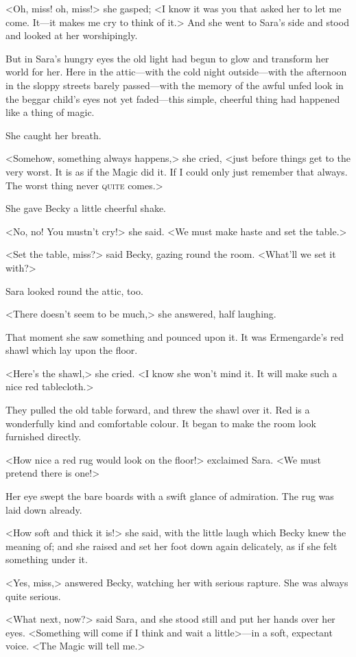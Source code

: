 <Oh, miss! oh, miss!> she gasped; <I know it was you that asked her to let me come. It—it makes me cry to think of it.> And she went to Sara's side and stood and looked at her worshipingly.

But in Sara's hungry eyes the old light had begun to glow and transform her world for her. Here in the attic—with the cold night outside—with the afternoon in the sloppy streets barely passed—with the memory of the awful unfed look in the beggar child's eyes not yet faded—this simple, cheerful thing had happened like a thing of magic.

She caught her breath.

<Somehow, something always happens,> she cried, <just before things get to the very worst. It is as if the Magic did it. If I could only just remember that always. The worst thing never \textsc{quite} comes.>

She gave Becky a little cheerful shake.

<No, no! You mustn't cry!> she said. <We must make haste and set the table.>

<Set the table, miss?> said Becky, gazing round the room. <What'll we set it with?>

Sara looked round the attic, too.

<There doesn't seem to be much,> she answered, half laughing.

That moment she saw something and pounced upon it. It was Ermengarde's red shawl which lay upon the floor.

<Here's the shawl,> she cried. <I know she won't mind it. It will make such a nice red tablecloth.>

They pulled the old table forward, and threw the shawl over it. Red is a wonderfully kind and comfortable colour. It began to make the room look furnished directly.

<How nice a red rug would look on the floor!> exclaimed Sara. <We must pretend there is one!>

Her eye swept the bare boards with a swift glance of admiration. The rug was laid down already.

<How soft and thick it is!> she said, with the little laugh which Becky knew the meaning of; and she raised and set her foot down again delicately, as if she felt something under it.

<Yes, miss,> answered Becky, watching her with serious rapture. She was always quite serious.

<What next, now?> said Sara, and she stood still and put her hands over her eyes. <Something will come if I think and wait a little>—in a soft, expectant voice. <The Magic will tell me.>

